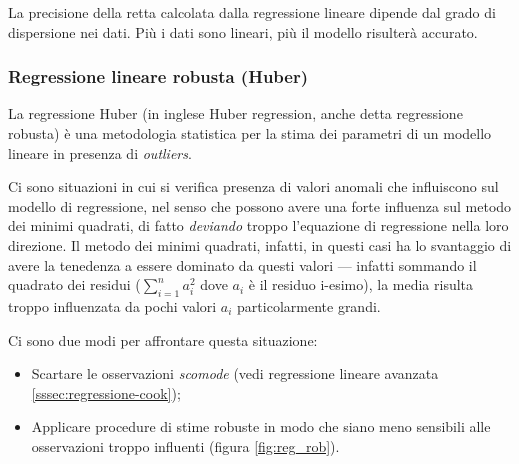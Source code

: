 La precisione della retta calcolata dalla regressione lineare dipende dal grado di dispersione nei dati. Più i dati sono lineari, più il modello risulterà accurato.

%
%
%

\subsubsection{Regressione lineare robusta (Huber)}\label{sssec:regressione-huber}
La regressione Huber (in inglese Huber regression, anche detta regressione robusta) è una metodologia statistica per la stima dei parametri di un modello lineare in presenza di \textit{outliers}.

Ci sono situazioni in cui si verifica presenza di valori anomali che influiscono sul modello di regressione, nel senso che possono avere una forte influenza sul metodo dei minimi quadrati, di fatto \textit{deviando} troppo l'equazione di regressione nella loro direzione. Il metodo dei minimi quadrati, infatti, in questi casi ha lo svantaggio di avere la tenedenza a essere dominato da questi valori — infatti sommando il quadrato dei residui ($\sum_{i=1}^{n} a_i^2$ dove $a_i$ è il residuo i-esimo), la media risulta troppo influenzata da pochi valori $a_i$ particolarmente grandi.

Ci sono due modi per affrontare questa situazione:

\begin{itemize}
  \item Scartare le osservazioni \textit{scomode} (vedi regressione lineare avanzata \ref{sssec:regressione-cook});
  \item Applicare procedure di stime robuste in modo che siano meno sensibili alle osservazioni troppo influenti (figura \ref{fig:reg_rob}).
\end{itemize}

